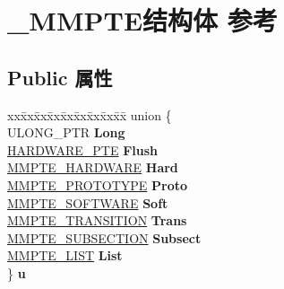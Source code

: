 \hypertarget{struct___m_m_p_t_e}{}\section{\+\_\+\+M\+M\+P\+T\+E结构体 参考}
\label{struct___m_m_p_t_e}
\subsection*{Public 属性}
\begin{DoxyCompactItemize}
\item 
\mbox{\label{struct___m_m_p_t_e_abc49121986573df3c3bd574d3ad3a911}} 
\begin{tabbing}
xx\=xx\=xx\=xx\=xx\=xx\=xx\=xx\=xx\=\kill
union \{\\
\>ULONG\_PTR {\bfseries Long}\\
\>\hyperlink{struct___h_a_r_d_w_a_r_e___p_t_e}{HARDWARE\_PTE} {\bfseries Flush}\\
\>\hyperlink{struct___m_m_p_t_e___h_a_r_d_w_a_r_e}{MMPTE\_HARDWARE} {\bfseries Hard}\\
\>\hyperlink{struct___m_m_p_t_e___p_r_o_t_o_t_y_p_e}{MMPTE\_PROTOTYPE} {\bfseries Proto}\\
\>\hyperlink{struct___m_m_p_t_e___s_o_f_t_w_a_r_e}{MMPTE\_SOFTWARE} {\bfseries Soft}\\
\>\hyperlink{struct___m_m_p_t_e___t_r_a_n_s_i_t_i_o_n}{MMPTE\_TRANSITION} {\bfseries Trans}\\
\>\hyperlink{struct___m_m_p_t_e___s_u_b_s_e_c_t_i_o_n}{MMPTE\_SUBSECTION} {\bfseries Subsect}\\
\>\hyperlink{struct___m_m_p_t_e___l_i_s_t}{MMPTE\_LIST} {\bfseries List}\\
\} {\bfseries u}\\


\end{tabbing}
\end{DoxyCompactItemize}
